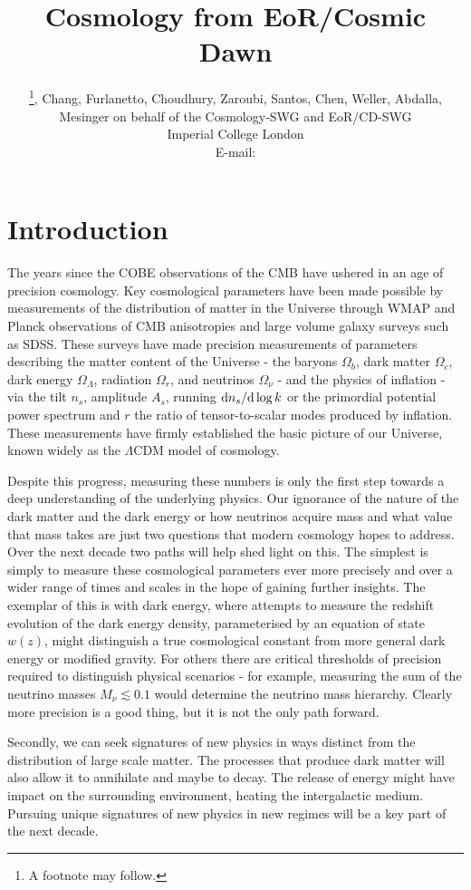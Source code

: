 \documentclass{PoS}
\title{Cosmology from EoR/Cosmic Dawn}
\author{\speaker{Pritchard}\thanks{A footnote may follow.}, Chang, Furlanetto, Choudhury, Zaroubi, Santos, Chen, Weller, Abdalla, Mesinger on behalf of the Cosmology-SWG and EoR/CD-SWG\\
        Imperial College London\\
        E-mail: \email{j.pritchard@imperial.ac.uk}}
\newcommand{\ud}{{\rm d}}
\begin{document}
\section{Introduction}

The years since the COBE observations of the CMB have ushered in an age of precision cosmology. Key cosmological parameters have been made possible by measurements of the distribution of matter in the Universe through WMAP and Planck observations of CMB anisotropies and large volume galaxy surveys such as SDSS. These surveys have made precision measurements of parameters describing the matter content of the Universe - the baryons $\Omega_b$, dark matter $\Omega_c$, dark energy $\Omega_\Lambda$, radiation $\Omega_r$, and neutrinos $\Omega_\nu$ - and the physics of inflation - via the tilt $n_s$, amplitude $A_s$, running $\ud n_s/\ud\log k$ or the primordial potential power spectrum and $r$ the ratio of tensor-to-scalar modes produced by inflation. These measurements have firmly established the basic picture of our Universe, known widely as the $\Lambda$CDM model of cosmology.

Despite this progress, measuring these numbers is only the first step towards a deep understanding of the underlying physics. Our ignorance of the nature of the dark matter and the dark energy or how neutrinos acquire mass and what value that mass takes are just two questions that modern cosmology hopes to address. Over the next decade two paths will help shed light on this. The simplest is simply to measure these cosmological parameters ever more precisely and over a wider range of times and scales in the hope of gaining further insights. The exemplar of this is with dark energy, where attempts to measure the redshift evolution of the dark energy density, parameterised by an equation of state $w(z)$, might distinguish a true cosmological constant from more general dark energy or modified gravity. For others there are critical thresholds of precision required to distinguish physical scenarios - for example, measuring the sum of the neutrino masses $M_\nu\lesssim0.1$ would determine the neutrino mass hierarchy. Clearly more precision is a good thing, but it is not the only path forward.

Secondly, we can seek signatures of new physics in ways distinct from the distribution of large scale matter. The processes that produce dark matter will also allow it to annihilate and maybe to decay. The release of energy might have impact on the surrounding environment, heating the intergalactic medium. Pursuing unique signatures of new physics in new regimes will be a key part of the next decade.
\end{document}
